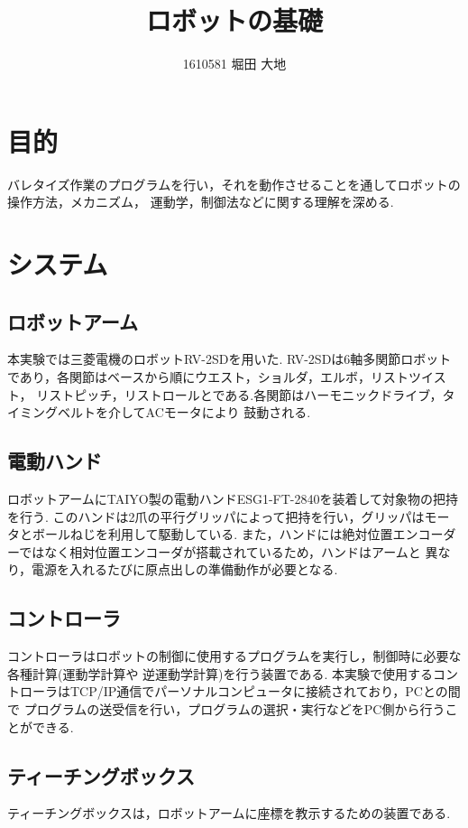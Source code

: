\documentclass[10pt,a4j]{jsarticle}
\title{\vspace{-2.5cm}ロボットの基礎}
\author{1610581 堀田 大地}
\begin{document}
\renewcommand{\baselinestretch}{0.90}
\maketitle{}
\section{目的}
バレタイズ作業のプログラムを行い，それを動作させることを通してロボットの操作方法，メカニズム，
運動学，制御法などに関する理解を深める.

\section{システム}
  \subsection{ロボットアーム}
  本実験では三菱電機のロボットRV-2SDを用いた.
  RV-2SDは6軸多関節ロボットであり，各関節はベースから順にウエスト，ショルダ，エルボ，リストツイスト，
  リストピッチ，リストロールとである.各関節はハーモニックドライブ，タイミングベルトを介してACモータにより
  鼓動される.

  \subsection{電動ハンド}
  ロボットアームにTAIYO製の電動ハンドESG1-FT-2840を装着して対象物の把持を行う.
  このハンドは2爪の平行グリッパによって把持を行い，グリッパはモータとボールねじを利用して駆動している.
  また，ハンドには絶対位置エンコーダーではなく相対位置エンコーダが搭載されているため，ハンドはアームと
  異なり，電源を入れるたびに原点出しの準備動作が必要となる.

  \subsection{コントローラ}
  コントローラはロボットの制御に使用するプログラムを実行し，制御時に必要な各種計算(運動学計算や
  逆運動学計算)を行う装置である.
  本実験で使用するコントローラはTCP/IP通信でパーソナルコンピュータに接続されており，PCとの間で
  プログラムの送受信を行い，プログラムの選択・実行などをPC側から行うことができる.

  \subsection{ティーチングボックス}
  ティーチングボックスは，ロボットアームに座標を教示するための装置である.
\end{document}
